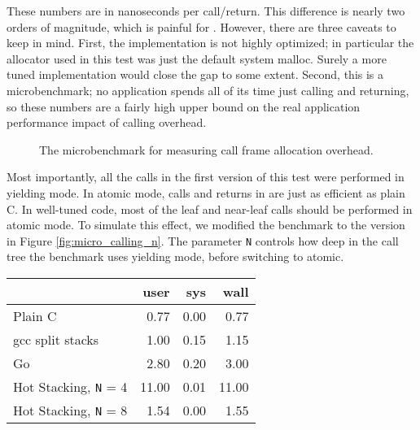 \documentclass[a4paper,UKenglish,cleveref, autoref]{lipics-v2019}
\begin{document}
These numbers are in nanoseconds per call/return.
This difference is nearly two orders of magnitude, which is painful for \charcoal{}.
However, there are three caveats to keep in mind.
First, the \charcoal{} implementation is not highly optimized; in particular the allocator used in this test was just the default system malloc.
Surely a more tuned implementation would close the gap to some extent.
Second, this is a microbenchmark; no application spends all of its time just calling and returning, so these numbers are a fairly high upper bound on the real application performance impact of calling overhead.

\begin{figure}
\caption{The microbenchmark for measuring call frame allocation overhead.}
\label{fig:micro_calling}
\end{figure}

Most importantly, all the calls in the first version of this test were performed in yielding mode.
In atomic mode, calls and returns in \charcoal{} are just as efficient as plain C.
In well-tuned \charcoal{} code, most of the leaf and near-leaf calls should be performed in atomic mode.
To simulate this effect, we modified the benchmark to the version in Figure \ref{fig:micro_calling_n}.
The parameter \texttt{N} controls how deep in the call tree the benchmark uses yielding mode, before switching to atomic.

\vspace{1em}
\begin{tabular}{|l|r|r|r|}
  \hline
   & user & sys & wall \\
  \hline
  \hline
  Plain C & 0.77 & 0.00 & 0.77 \\
  \hline
  gcc split stacks\footnotemark{} & 1.00 & 0.15 & 1.15 \\
  \hline
  Go & 2.80 & 0.20 & 3.00 \\
  \hline
  Hot Stacking, \texttt{N} = 4 & 11.00 & 0.01 & 11.00 \\
  \hline
  Hot Stacking, \texttt{N} = 8 & 1.54 & 0.00 & 1.55 \\
  \hline
\end{tabular}
\vspace{1em}

\end{document}
